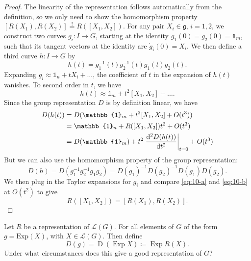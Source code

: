 \begin{proof}
  The linearity of the representation follows automatically from the definition, so we only need to show the homomorphism property $[R(X_1), R(X_2)] \stackrel{!}{=} R([X_1, X_2])$.
  For any pair $X_i \in \mathfrak{g}$, $i = 1, 2$, we construct two curves $g_i \colon I \to G$, starting at the identity $g_1(0) = g_2(0) = \mathbb{1}_m$, such that its tangent vectors at the identity are $\dot g_i(0) = X_i$.
  We then define a third curve $h \colon I \to G$ by
  \begin{equation}
    h(t) = g_1^{-1}(t)g_2^{-1}(t)g_1(t)g_2(t).
  \end{equation}
  Expanding $g_i \approx \mathbb{1}_n + t X_i + \dots$, the coefficient of $t$ in the expansion of $h(t)$ vanishes. To second order in $t$, we have
  \begin{equation}
    h(t) \approx \mathbb{1}_m + t^2 [X_1, X_2] + \dots.
  \end{equation}
  Since the group representation $D$ is by definition linear, we have
  \begin{align}
    D(h(t)) &= D(\mathbb{1}_m + t^2 [X_1, X_2] + O(t^3)) \\
	    &= \mathbb{1}_n + R([X_1, X_2]) t^2 + O(t^3) \label{eq:10-b} \\
	    &= D(\mathbb{1}_m) + t^2 \left.\dv[2]{D(h(t))}{t}\right\rvert_{t = 0} + O(t^3)
  \end{align}
  But we can also use the homomorphism property of the group representation:
  \begin{equation}
    D(h) = D(g_1^{-1} g_2^{-1} g_1 g_2) = D(g_1)^{-1} D(g_2)^{-1} D(g_1) D(g_2) \label{eq:10-a}.
  \end{equation}
  We then plug in the Taylor expansions for $g_i$ and compare \eqref{eq:10-a} and \eqref{eq:10-b} at $O(t^2)$ to give
  \begin{equation}
    R([X_1, X_2]) = [R(X_1), R(X_2)].
  \end{equation}
\end{proof}
\begin{exercise}
  Let $R$ be a representation of $\mathscr{L}(G)$. For all elements of $G$ of the form $g = \text{Exp}(X)$, with $X \in \mathscr{L}(G)$. Then define
  \begin{equation}
    D(g) = \operatorname D (\operatorname{Exp} X) \coloneqq \operatorname{Exp} R(X).
  \end{equation}
  Under what circumstances does this give a good representation of $G$?
\end{exercise}

